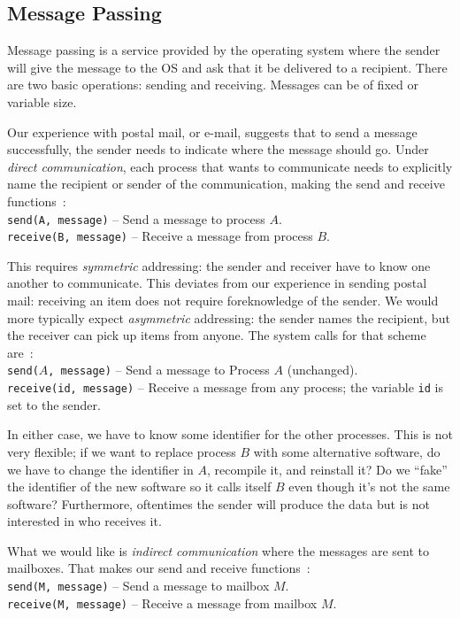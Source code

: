 \documentclass[a4paper]{report}
\begin{document}
\subsection*{Message Passing}

Message passing is a service provided by the operating system where the sender will give the message to the OS and ask that it be delivered to a recipient. There are two basic operations: sending and receiving. Messages can be of fixed or variable size.

Our experience with postal mail, or e-mail, suggests that to send a message successfully, the sender needs to indicate where the message should go. Under \textit{direct communication}, each process that wants to communicate needs to explicitly name the recipient or sender of the communication, making the send and receive functions~\cite{osc}:\\
\texttt{send(A, message)} -- Send a message to process $A$.\\
\texttt{receive(B, message)} -- Receive a message from process $B$.

This requires \textit{symmetric} addressing: the sender and receiver have to know one another to communicate. This deviates from our experience in sending postal mail: receiving an item does not require foreknowledge of the sender. We would more typically expect \textit{asymmetric} addressing: the sender names the recipient, but the receiver can pick up items from anyone. The system calls for that scheme are~\cite{osc}:\\
\texttt{send($A$, message)} -- Send a message to Process $A$ (unchanged).\\
\texttt{receive(id, message)} -- Receive a message from any process; the variable \texttt{id} is set to the sender.

In either case, we have to know some identifier for the other processes. This is not very flexible; if we want to replace process $B$ with some alternative software, do we have to change the identifier in $A$, recompile it, and reinstall it? Do we ``fake'' the identifier of the new software so it calls itself $B$ even though it's not the same software? Furthermore, oftentimes  the sender will produce the data but is not interested in who receives it.

What we would like is \textit{indirect communication} where the messages are sent to mailboxes. That makes our send and receive functions~\cite{osc}:\\
\texttt{send(M, message)} -- Send a message to mailbox $M$.\\
\texttt{receive(M, message)} -- Receive a message from mailbox $M$.
\end{document}
